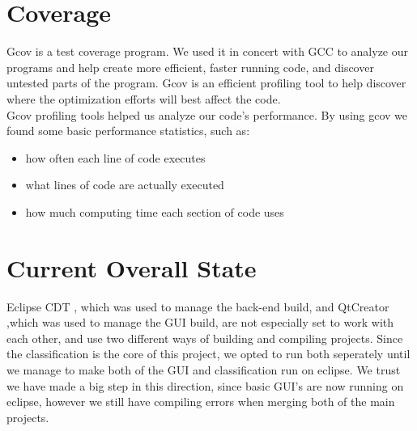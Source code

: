 \documentclass[parskip=full]{scrartcl}
\begin{document}
\section {Coverage}
Gcov is a test coverage program. We used it in concert with GCC to analyze our programs and help create more efficient, faster running code, and discover untested parts of the program. Gcov is an efficient profiling tool to help discover where the optimization efforts will best affect the code.\\
Gcov profiling tools helped us analyze our code's performance. By using gcov we found some basic performance statistics, such as:
\begin{itemize}
	\item how often each line of code executes
	\item what lines of code are actually executed
	\item how much computing time each section of code uses
\end {itemize}


\pagebreak
\section {Current Overall State}
Eclipse CDT , which was used to manage the back-end build, and QtCreator ,which was used to manage the GUI build, are not especially set to work with each other, and use two different ways of building and compiling projects.
Since the classification is the core of this project, we opted to run both seperately until we manage to make both of the GUI and classification run on eclipse. We trust we have made a big step in this direction, since basic GUI's are now running on eclipse, however we still have compiling errors when merging both of the main projects.
\end{document}
